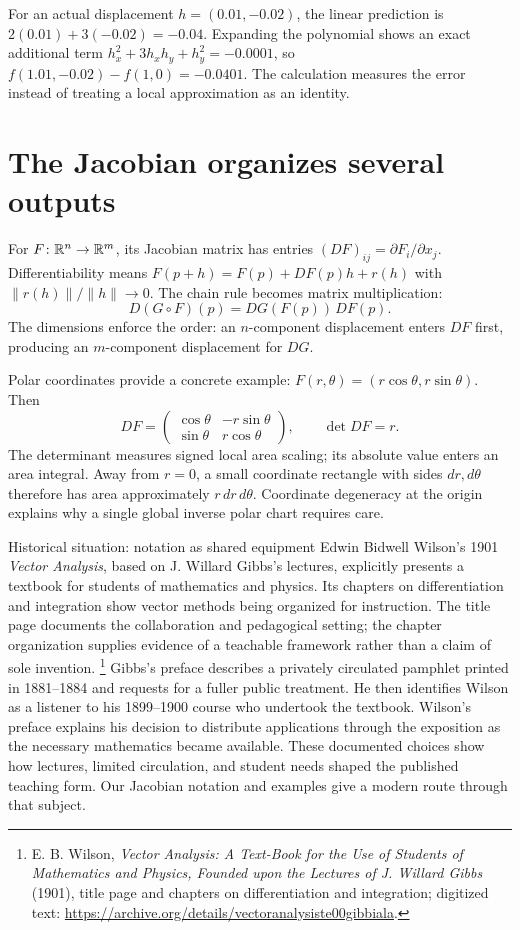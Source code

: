 For an actual displacement $h=(0.01,-0.02)$, the linear prediction is
$2(0.01)+3(-0.02)=-0.04$. Expanding the polynomial shows an exact
additional term $h_x^2+3h_xh_y+h_y^2=-0.0001$, so
$f(1.01,-0.02)-f(1,0)=-0.0401$. The calculation measures the error
instead of treating a local approximation as an identity.

\section{The Jacobian organizes several outputs}
For $F\colon\mathbb{R}^n\to\mathbb{R}^m$, its Jacobian matrix has entries
$(DF)_{ij}=\partial F_i/\partial x_j$. Differentiability means
$F(p+h)=F(p)+DF(p)h+r(h)$ with $\|r(h)\|/\|h\|\to0$.
The chain rule becomes matrix multiplication:
\[
 D(G\circ F)(p)=DG(F(p))\,DF(p).
\]
The dimensions enforce the order: an $n$-component displacement enters
$DF$ first, producing an $m$-component displacement for $DG$.

Polar coordinates provide a concrete example:
$F(r,\theta)=(r\cos\theta,r\sin\theta)$. Then
\[
 DF=\begin{pmatrix}\cos\theta&-r\sin\theta\\
 \sin\theta&r\cos\theta\end{pmatrix},\qquad \det DF=r.
\]
The determinant measures signed local area scaling; its absolute value
enters an area integral. Away from $r=0$, a small coordinate rectangle
with sides $dr,d\theta$ therefore has area approximately $r\,dr\,d\theta$.
Coordinate degeneracy at the origin explains why a single global inverse
polar chart requires care.

\begin{learningcard}[breakable=false]{Historical situation: notation as shared equipment}
Edwin Bidwell Wilson's 1901 \emph{Vector Analysis}, based on J. Willard
Gibbs's lectures, explicitly presents a textbook for students of mathematics
and physics. Its chapters on differentiation and integration show vector
methods being organized for instruction. The title page documents the
collaboration and pedagogical setting; the chapter organization supplies
evidence of a teachable framework rather than a claim of sole invention.
\footnote{E. B. Wilson, \emph{Vector Analysis: A Text-Book for the Use of
Students of Mathematics and Physics, Founded upon the Lectures of
J. Willard Gibbs} (1901), title page and chapters on differentiation and
integration; digitized text:
\url{https://archive.org/details/vectoranalysiste00gibbiala}.}
Gibbs's preface describes a privately circulated pamphlet printed in
1881--1884 and requests for a fuller public treatment. He then identifies
Wilson as a listener to his 1899--1900 course who undertook the textbook.
Wilson's preface explains his decision to distribute applications through
the exposition as the necessary mathematics became available. These
documented choices show how lectures, limited circulation, and student
needs shaped the published teaching form. Our Jacobian notation and
examples give a modern route through that subject.
\end{learningcard}


